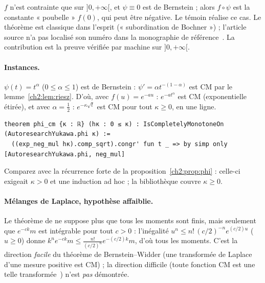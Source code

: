 \begin{remark}
$f$ n'est contrainte que sur $]0,+\infty[$, et $\psi\equiv0$ est de Bernstein ; alors $f\circ\psi$ est la constante
« poubelle » $f(0)$, qui peut être négative. Le témoin  réalise ce cas. Le théorème est
classique dans l'esprit (« subordination de Bochner ») ; l'article source n'a pas localisé son numéro dans la
monographie de référence~\cite{ch2ssv}. La contribution est la preuve vérifiée par machine sur $]0,+\infty[$.
\end{remark}

\paragraph{Instances.} $\psi(t)=t^\alpha$ ($0\le\alpha\le1$) est de Bernstein : $\psi'=\alpha t^{-(1-\alpha)}$ est CM
par le lemme~\ref{ch2:lem:riesz}. D'où, avec $f(u)=e^{-au}$ : $e^{-at^\alpha}$ est CM (exponentielle étirée), et avec
$\alpha=\frac12$ : $e^{-\kappa\sqrt t}$ est CM pour tout $\kappa\ge0$, en une ligne.
\begin{leanbox}
\begin{lstlisting}[style=chdeux]
theorem phi_cm {κ : ℝ} (hκ : 0 ≤ κ) : IsCompletelyMonotoneOn (AutoresearchYukawa.phi κ) :=
  ((exp_neg_mul hκ).comp_sqrt).congr' fun t _ => by simp only [AutoresearchYukawa.phi, neg_mul]
\end{lstlisting}
\end{leanbox}
\noindent Comparez avec la récurrence forte de la proposition~\ref{ch2:prop:phi} : celle-ci exigeait $\kappa>0$ et une
induction ad hoc ; la bibliothèque couvre $\kappa\ge0$.

\paragraph{Mélanges de Laplace, hypothèse affaiblie.} Le théorème  de  ne suppose
plus que tous les moments sont finis, mais seulement que $e^{-ck}m$ est intégrable pour tout $c>0$ : l'inégalité
$u^n\le n!\,(c/2)^{-n}e^{(c/2)u}$ ($u\ge0$) donne $k^ne^{-ck}m\le\frac{n!}{(c/2)^n}e^{-(c/2)k}m$, d'où tous les
moments. C'est la direction \emph{facile} du théorème de Bernstein--Widder (une transformée de Laplace d'une mesure
positive est CM) ; la direction difficile (toute fonction CM est une telle transformée~\cite{widder}) n'est
\emph{pas} démontrée.

